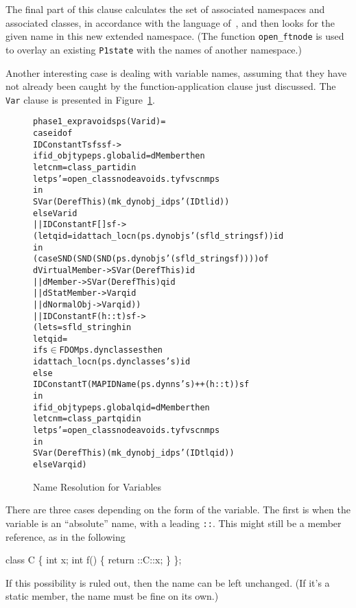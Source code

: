 \documentclass[11pt]{article}
\begin{document}
The final part of this clause calculates the set of associated
namespaces and associated classes, in accordance with the language
of~\cite[\S3.4.2, paragraph~2]{cpp-standard-iso14882}, and then looks
for the given name in this new extended namespace.  (The function
\texttt{open_ftnode} is used to overlay an existing \texttt{P1state}
with the names of another namespace.)

\bigskip
\noindent
Another interesting case is dealing with variable names, assuming that
they have not already been caught by the function-application clause
just discussed.  The \texttt{Var} clause is presented in
Figure~\ref{fig:phase1expr:var}. 
\begin{figure}[htbp]
\begin{alltt}
   phase1_expr avoids ps (Var id) =
      case id of
         IDConstant T sfs sf ->
           if id_objtype ps.global id = dMember then
             let cnm = class_part id in
             let ps' = open_classnode avoids.tyfvs cnm ps
             in
               SVar (Deref This) (mk_dynobj_id ps' (IDtl id))
           else Var id
      || IDConstant F [] sf ->
           (let qid = idattach_locn (ps.dynobjs ' (sfld_string sf)) id
            in
              (case SND (SND (SND (ps.dynobjs ' (sfld_string sf)))) of
                  dVirtualMember -> SVar (Deref This) id
               || dMember -> SVar (Deref This) qid
               || dStatMember -> Var qid
               || dNormalObj -> Var qid))
      || IDConstant F (h::t) sf ->
           (let s = sfld_string h in
            let qid =
                if s \(\in\) FDOM ps.dynclasses then
                  idattach_locn (ps.dynclasses ' s) id
                else
                  IDConstant T (MAP IDName (ps.dynns ' s) ++ (h::t)) sf
            in
              if id_objtype ps.global qid = dMember then
                let cnm = class_part qid in
                let ps' = open_classnode avoids.tyfvs cnm ps
                in
                  SVar (Deref This) (mk_dynobj_id ps' (IDtl qid))
              else Var qid)
\end{alltt}
\caption{Name Resolution for Variables}
\label{fig:phase1expr:var}
\end{figure}
There are three cases depending on the form of the variable.  The
first is when the variable is an ``absolute'' name, with a leading
\texttt{::}.  This might still be a member reference, as in the
following
\begin{stdrule}
   class C \{
     int x;
     int f() \{ return ::C::x; \}
   \};
\end{stdrule}
If this possibility is ruled out, then the name can be left
unchanged.  (If it's a static member, the name must be fine on its
own.)
\end{document}
